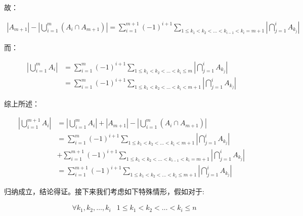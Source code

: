 \documentclass[UTF8]{book}
\begin{document}
故：
\begin{large}
    \begin{equation}
        \begin{aligned}
            \left | A_{m+1} \right |-\left | \bigcup_{i=1}^{m} \left (A_i \cap A_{m+1} \right ) \right |=\sum_{i=1}^{m+1}(-1)^{i+1}\sum_{1 \le k_1 < k_2 < \dots < k_{i-1} < k_i = m+1} \left | \bigcap_{j=1}^{i} A_{k_j}\right |
            \nonumber
        \end{aligned}
    \end{equation}
\end{large}
而：
\begin{large}
    \begin{equation}
        \begin{aligned}
            \left | \bigcup_{i=1}^{m}A_i \right | &= \sum_{i=1}^{m}(-1)^{i+1}\sum_{1 \le k_1 < k_2 < \dots < k_i \le m} \left | \bigcap_{j=1}^i A_{k_j} \right | \\
            &= \sum_{i=1}^{m}(-1)^{i+1}\sum_{1 \le k_1 < k_2 < \dots < k_i < m+1} \left | \bigcap_{j=1}^i A_{k_j} \right |
            \nonumber
        \end{aligned}
    \end{equation}
\end{large}
综上所述：
\begin{large}
    \begin{equation}
        \begin{aligned}
            \left | \bigcup_{i=1}^{m+1}A_i \right | &= \left | \bigcup_{i=1}^{m}A_i \right | + \left | A_{m+1} \right |-\left | \bigcup_{i=1}^{m} \left (A_i \cap A_{m+1} \right ) \right | \\
            &= \sum_{i=1}^{m}(-1)^{i+1}\sum_{1 \le k_1 < k_2 < \dots < k_i < m+1} \left | \bigcap_{j=1}^i A_{k_j} \right | \\
            &+ \sum_{i=1}^{m+1}(-1)^{i+1}\sum_{1 \le k_1 < k_2 < \dots < k_{i-1} < k_i = m+1} \left | \bigcap_{j=1}^{i} A_{k_j}\right |\\
            &= \sum_{i=1}^{m+1}(-1)^{i+1}\sum_{1 \le k_1 < k_2 < \dots < k_i \le m+1} \left | \bigcap_{j=1}^i A_{k_j} \right |
            \nonumber
        \end{aligned}
    \end{equation}
\end{large}
归纳成立，结论得证。接下来我们考虑如下特殊情形，假如对于:
\begin{large}
    \begin{equation}
        \begin{aligned}
            &\forall k_1, k_2, \dots, k_i & 1 \le k_1 < k_2 < \dots < k_i \le n\\
            \nonumber
        \end{aligned}
    \end{equation}
\end{large}
\end{document}
